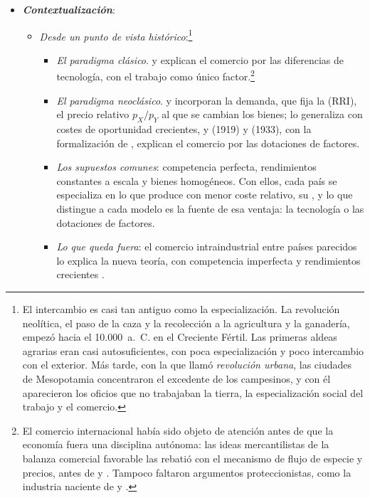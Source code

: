 \documentclass[11pt]{article}
\begin{document}
\begin{itemize}
\item \textbf{\emph{Contextualización}}:
  \begin{itemize}
  \item \emph{Desde un punto de vista histórico}:\footnote{El intercambio es casi tan antiguo como la especialización. La revolución neolítica, el paso de la caza y la recolección a la agricultura y la ganadería, empezó hacia el 10.000~a.~C. en el Creciente Fértil\nocite{NatGeo2026Neolitico}. Las primeras aldeas agrarias eran casi autosuficientes, con poca especialización y poco intercambio con el exterior. Más tarde, con la que \textcite{Childe1950Urban} llamó \emph{revolución urbana}, las ciudades de Mesopotamia concentraron el excedente de los campesinos, y con él aparecieron los oficios que no trabajaban la tierra, la especialización social del trabajo y el comercio.}
  \begin{itemize}
  \item \emph{El paradigma clásico}. \textcite{Smith1776Wealth} y \textcite{Ricardo1821Principles} explican el comercio por las diferencias de tecnología, con el trabajo como único factor.\footnote{El comercio internacional había sido objeto de atención antes de que la economía fuera una disciplina autónoma: las ideas mercantilistas de la balanza comercial favorable las rebatió \textcite{Hume1752Balance} con el mecanismo de flujo de especie y precios, antes de  y  . Tampoco faltaron argumentos proteccionistas, como la industria naciente de \textcite{Hamilton1791Report} y \textcite{List1841System} .}
  \item \emph{El paradigma neoclásico}.  y  incorporan la demanda, que fija la  (RRI), el precio relativo $p_X/p_Y$ al que se cambian los bienes; \textcite{Haberler1936Theory} lo generaliza con costes de oportunidad crecientes, y  (1919) y  (1933), con la formalización de , explican el comercio por las dotaciones de factores.
  \item \emph{Los supuestos comunes}: competencia perfecta, rendimientos constantes a escala y bienes homogéneos. Con ellos, cada país se especializa en lo que produce con menor coste relativo, su , y lo que distingue a cada modelo es la fuente de esa ventaja: la tecnología o las dotaciones de factores.
  \item \emph{Lo que queda fuera}: el comercio intraindustrial entre países parecidos lo explica la nueva teoría, con competencia imperfecta y rendimientos crecientes .
  \end{itemize}
  \end{itemize}


\end{itemize}
\end{document}
